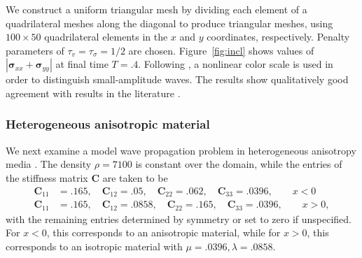\documentclass{siamart0216}
\newcommand{\LRb}[1]{\left| #1 \right|}
\newcommand{\note}[1]{{\color{blue}{#1}}}
\begin{document}
We construct a uniform triangular mesh by dividing each element of a quadrilateral meshes along the diagonal to produce triangular meshes, using $100 \times 50$ quadrilateral elements in the $x$ and $y$ coordinates, respectively.  Penalty parameters of $\tau_v = \tau_\sigma = 1/2$ are chosen.  Figure~\ref{fig:incl} shows values of $\LRb{\bm{\sigma}_{xx} + \bm{\sigma}_{yy}}$ at final time $T=.4$.  Following \cite{leveque2002finite}, a nonlinear color scale is used in order to distinguish small-amplitude waves.  The results show qualitatively good agreement with results in the literature \cite{leveque2002finite,kaser2006arbitrary,appelo2015energy}.  


\subsubsection{Heterogeneous anisotropic material}

We next examine a model wave propagation problem in heterogeneous anisotropy media \cite{carcione1988wave,komatitsch2000simulation,de2007arbitrary}.   The density $\rho = 7100$ is constant over the domain, while the entries of the stiffness matrix $\bm{C}$ are taken to be
\begin{align*}
\bm{C}_{11} &= .165, \quad \bm{C}_{12} = .05, \quad \bm{C}_{22} = .062, \quad \bm{C}_{33} = .0396, \qquad x < 0\\
\bm{C}_{11} &= .165, \quad \bm{C}_{12} = .0858, \quad \bm{C}_{22} = .165, \quad \bm{C}_{33} = .0396, \qquad x > 0,
\end{align*}
with the remaining entries determined by symmetry or set to zero if unspecified.  For $ x < 0$, this corresponds to an anisotropic material, while for $x > 0$, this corresponds to an isotropic material with $\mu = .0396, \lambda = .0858$.
\end{document}
